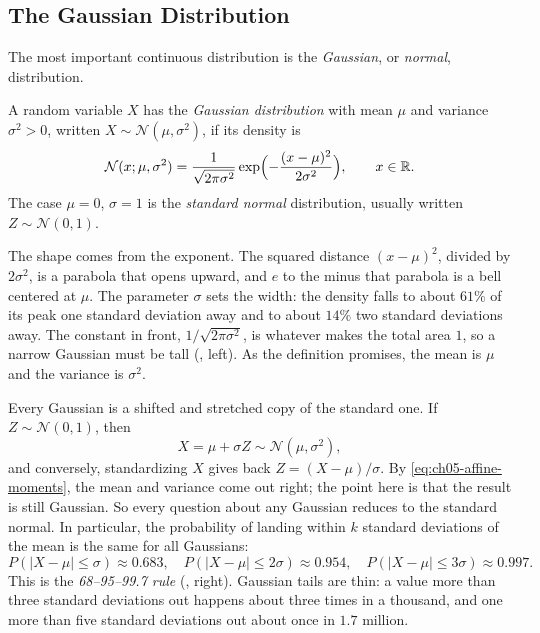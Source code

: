 \subsection{The Gaussian Distribution}
\label{sec:ch05-gaussian}

The most important continuous distribution is the \emph{Gaussian}, or
\emph{normal}, distribution.

\begin{definition}
  \label{def:gaussian}
  A random variable $X$ has the \emph{Gaussian distribution} with mean
  $\mu$ and variance $\sigma^2 > 0$, written $X \sim \mathcal{N}(\mu,
  \sigma^2)$, if its density is
  \[
    \mathcal{N}(x; \mu, \sigma^2)
    = \frac{1}{\sqrt{2\pi\sigma^2}}
      \exp\Bigl(-\frac{(x - \mu)^2}{2\sigma^2}\Bigr),
    \qquad x \in \mathbb{R} .
  \]
  The case $\mu = 0$, $\sigma = 1$ is the \emph{standard normal}
  distribution, usually written $Z \sim \mathcal{N}(0, 1)$.
\end{definition}

The shape comes from the exponent. The squared distance $(x - \mu)^2$,
divided by $2\sigma^2$, is a parabola that opens upward, and $e$ to the
minus that parabola is a bell centered at $\mu$. The parameter $\sigma$
sets the width: the density falls to about $61\%$ of its peak one
standard deviation away and to about $14\%$ two standard deviations
away. The constant in front, $1/\sqrt{2\pi\sigma^2}$, is whatever makes
the total area $1$, so a narrow Gaussian must be tall
(, left). As the definition promises, the mean
is $\mu$ and the variance is $\sigma^2$.

Every Gaussian is a shifted and stretched copy of the standard one. If
$Z \sim \mathcal{N}(0, 1)$, then
\begin{equation}
  X = \mu + \sigma Z \sim \mathcal{N}(\mu, \sigma^2),
  \label{eq:ch05-gaussian-affine}
\end{equation}
and conversely, standardizing $X$ gives back $Z = (X - \mu)/\sigma$.
By \cref{eq:ch05-affine-moments}, the mean and variance come out right;
the point here is that the result is still Gaussian. So every question
about any Gaussian reduces to the standard normal. In particular, the
probability of landing within $k$ standard deviations of the mean is
the same for all Gaussians:
\[
  P(|X - \mu| \le \sigma) \approx 0.683, \quad
  P(|X - \mu| \le 2\sigma) \approx 0.954, \quad
  P(|X - \mu| \le 3\sigma) \approx 0.997 .
\]
This is the \emph{68--95--99.7 rule} (, right).
Gaussian tails are thin: a value more than three standard deviations out
happens about three times in a thousand, and one more than five standard
deviations out about once in $1.7$ million.

